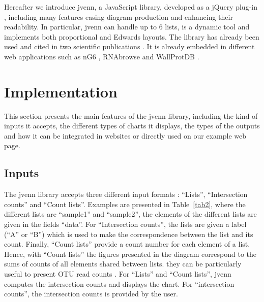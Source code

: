 \documentclass[11pt]{bmc_article_s50}
\begin{document}
Hereafter we introduce jvenn, a JavaScript library, developed as a jQuery
plug-in \cite{jquery}, including many features easing diagram production and
enhancing their readability. In particular, jvenn can handle up to 6 lists, is
a dynamic tool and implements both proportional and Edwards layouts. The
library has already been used and cited in two scientific publications
\cite{Bianchia2013, Aravindraja2013}. It is already embedded in different web
applications such as nG6 \cite{Mariette2012}, RNAbrowse \cite{Mariette2014} and
WallProtDB \cite{SanClemente}.

\section*{Implementation}

This section presents the main features of the jvenn library, including the
kind of inputs it accepts, the different types of charts it displays, the types
of the outputs and how it can be integrated in websites or directly used on our
example web page.

\subsection*{Inputs}

The jvenn library accepts three different input formats : ``Lists'',
``Intersection counts'' and ``Count lists''. Examples are presented in
Table~\ref{tab2}, where the different lists are ``sample1'' and
``sample2'', the elements of the different lists are given in the fields
``data''. For ``Intersection counts'', the lists are given a label (``A'' or
``B'') which is used to make the correspondence between the list and its count.
Finally, ``Count lists'' provide a count number for each element of a list.
Hence, with ``Count lists'' the figures presented in the diagram correspond to
the sums of counts of all elements shared between lists. they can be
particularly useful to present OTU read counts \cite{Aravindraja2013}. For
``Lists'' and ``Count lists'', jvenn computes the intersection counts and
displays the chart. For ``intersection counts'', the intersection counts is
provided by the user.
\end{document}
